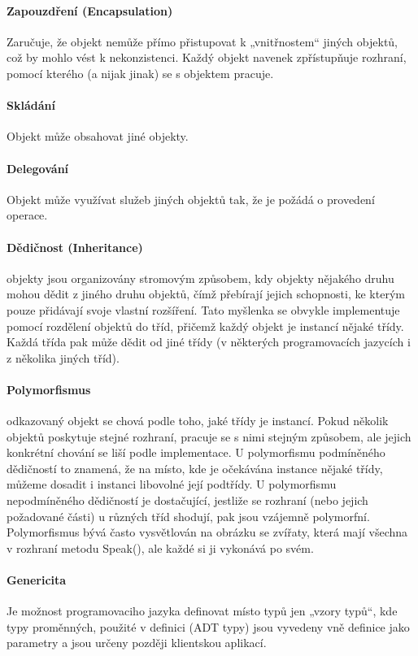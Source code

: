 \documentclass[10pt,a4paper]{article}
\begin{document}
\paragraph{Zapouzdření (Encapsulation)}
Zaručuje, že objekt nemůže přímo přistupovat k „vnitřnostem“ jiných objektů, což by mohlo vést k nekonzistenci. Každý objekt navenek zpřístupňuje rozhraní, pomocí kterého (a nijak jinak) se s objektem pracuje.

\paragraph{Skládání}
Objekt může obsahovat jiné objekty.

\paragraph{Delegování}
Objekt může využívat služeb jiných objektů tak, že je požádá o provedení operace.

\paragraph{Dědičnost (Inheritance)}
objekty jsou organizovány stromovým způsobem, kdy objekty nějakého druhu mohou dědit z jiného druhu objektů, čímž přebírají jejich schopnosti, ke kterým pouze přidávají svoje vlastní rozšíření. Tato myšlenka se obvykle implementuje pomocí rozdělení objektů do tříd, přičemž každý objekt je instancí nějaké třídy. Každá třída pak může dědit od jiné třídy (v některých programovacích jazycích i z několika jiných tříd).

\paragraph{Polymorfismus}
odkazovaný objekt se chová podle toho, jaké třídy je instancí. Pokud několik objektů poskytuje stejné rozhraní, pracuje se s nimi stejným způsobem, ale jejich konkrétní chování se liší podle implementace. U polymorfismu podmíněného dědičností to znamená, že na místo, kde je očekávána instance nějaké třídy, můžeme dosadit i instanci libovolné její podtřídy. U polymorfismu nepodmíněného dědičností je dostačující, jestliže se rozhraní (nebo jejich požadované části) u různých tříd shodují, pak jsou vzájemně polymorfní. Polymorfismus bývá často vysvětlován na obrázku se zvířaty, která mají všechna v rozhraní metodu Speak(), ale každé si ji vykonává po svém. 
\paragraph{Genericita}
Je možnost programovaciho jazyka definovat místo typů jen „vzory typů“, kde typy proměnných, použité v definici (ADT typy) jsou vyvedeny vně definice jako parametry a jsou určeny později klientskou aplikací.
\end{document}
